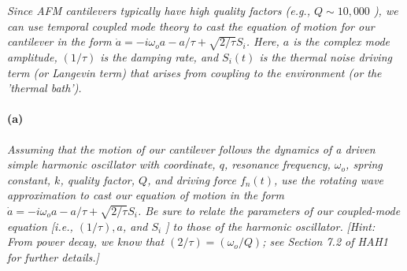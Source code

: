 \documentclass[hyperref, a4paper]{article}
\begin{document}
\textit{Since AFM cantilevers typically have high quality factors (e.g., $Q \sim 10,000$ ), we can use temporal coupled mode theory to cast the equation of motion for our cantilever in the form $\dot{a}=-i \omega_o a-a / \tau+\sqrt{2 / \tau} S_i$. Here, $a$ is the complex mode amplitude, $(1 / \tau)$ is the damping rate, and $S_i(t)$ is the thermal noise driving term (or Langevin term) that arises from coupling to the environment (or the 'thermal bath').}

\paragraph*{(a)} \textit{Assuming that the motion of our cantilever follows the dynamics of a driven simple harmonic oscillator with coordinate, $q$, resonance frequency, $\omega_o$, spring constant, $k$, quality factor, $Q$, and driving force $f_n(t)$, use the rotating wave approximation to cast our equation of motion in the form $\dot{a}=-i \omega_o a-a / \tau+\sqrt{2 / \tau} S_i$. Be sure to relate the parameters of our coupled-mode equation [i.e., $(1 / \tau), a$, and $S_i$ ] to those of the harmonic oscillator.} 
\textit{[Hint: From power decay, we know that $(2 / \tau)=\left(\omega_o / Q\right)$; see Section 7.2 of HAH1 for further details.]}
\end{document}
